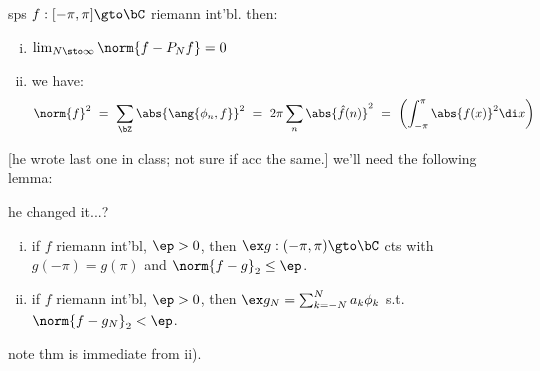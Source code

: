 \newpage
\begin{thm}[title=Parseval/Plancherel]
	sps $f:[-\pi,\pi]\gto\bC$ riemann int'bl. then:
	\begin{enumerate}[i)]
		\item $\lim_{N\sto\infty}\norm{f-P_{N}f}=0$
		\item we have:
			\begin{equation*}
				\norm{f}^{2} \ = \ \sum_{\bZ}\abs{\ang{\phi_{n},f}}^{2}
				\ = \ 2\pi\sum_{n}\abs{\hat{f}(n)}^{2}
				\ = \ \left(\int_{-\pi}^{\pi}\abs{f(x)}^{2}\di x\right)
			\end{equation*}
	\end{enumerate}
\end{thm}
[he wrote last one in class; not sure if acc the same.]
we'll need the following lemma:
\begin{lm}
	he changed it...?
	\begin{enumerate}[i)]
		\item if $f$ riemann int'bl, $\ep>0$, then
			$\ex g:(-\pi,\pi)\gto\bC$ cts with $g(-\pi)=g(\pi)$ and
			$\norm{f-g}_{2}\leq\ep$.
		\item if $f$ riemann int'bl, $\ep>0$, then
			$\ex g_{N}=\sum_{k=-N}^{N}a_{k}\phi_{k}$ s.t. $\norm{f-g_{N}}_{2}<\ep$.
	\end{enumerate}
\end{lm}
note thm is immediate from ii).

